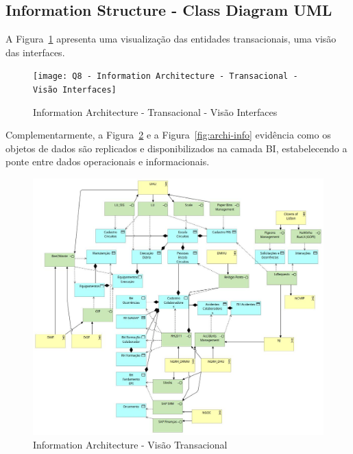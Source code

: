 \documentclass[12pt,a4paper,final]{article}
\begin{document}
    \subsection*{Information Structure - Class Diagram UML}\label{subsec:class-diagram-uml}
    A Figura~\ref{fig:uml-interfaces} apresenta uma visualização das entidades transacionais, uma visão das interfaces.

    \begin{figure}[H]
        \centering
        \texttt{[image: Q8 - Information Architecture - Transacional - Visão Interfaces]}
        \caption{Information Architecture - Transacional - Visão Interfaces}
        \label{fig:uml-interfaces}
    \end{figure}

    Complementarmente, a Figura~\ref{fig:archi-full} e a Figura~\ref{fig:archi-info} evidência
    como os objetos de dados são replicados e disponibilizados na camada BI,
    estabelecendo a ponte entre dados operacionais e informacionais.

    \begin{figure}[H]
        \centering
        \includegraphics[width=\textwidth]{Q8 - Information Architecture - Transacional}
        \caption{Information Architecture - Visão Transacional}
        \label{fig:archi-full}
    \end{figure}
\end{document}
